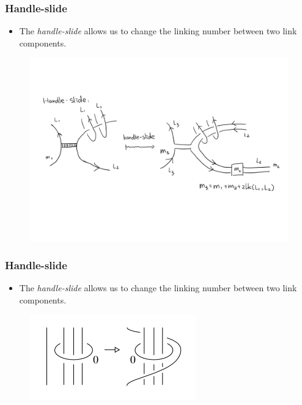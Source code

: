 \documentclass{beamer}
\theoremstyle{ex}
\theoremstyle{rem}
\begin{document}
	\begin{frame}
		\frametitle{Handle-slide}
		\begin{itemize}
			\item The \textit{handle-slide} allows us to change the linking number between two link components.
		\end{itemize}
		\begin{figure}
			\includegraphics[scale=0.09]{handleslide}
		\end{figure}
	\end{frame}
	
	\begin{frame}
		\frametitle{Handle-slide}
		\begin{itemize}
			\item The \textit{handle-slide} allows us to change the linking number between two link components.
		\end{itemize}
		\vspace{3em}
		\begin{figure}
			\includegraphics[scale=1.25]{handleslide2}
		\end{figure}
		\vspace{2em}
	\end{frame}
	
\end{document}
